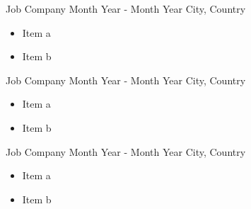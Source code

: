 
\cvevent
{Job}
{Company}
{Month Year - Month Year}
{City, Country}
{
    \begin{itemize}
        \item Item a
        \item Item b
    \end{itemize}
}

\divider

\cvevent
{Job}
{Company}
{Month Year - Month Year}
{City, Country}
{
    \begin{itemize}
        \item Item a
        \item Item b
    \end{itemize}
}

\divider

\cvevent
{Job}
{Company}
{Month Year - Month Year}
{City, Country}
{
    \begin{itemize}
        \item Item a
        \item Item b
    \end{itemize}
}

\divider
